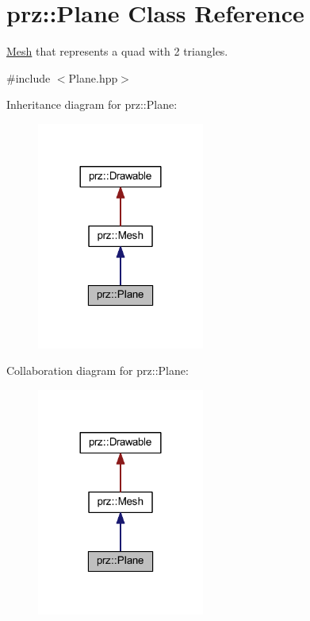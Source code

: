 \hypertarget{classprz_1_1_plane}{}\section{prz\+::Plane Class Reference}
\label{classprz_1_1_plane}


\mbox{\hyperlink{classprz_1_1_mesh}{Mesh}} that represents a quad with 2 triangles.  




{\ttfamily \#include $<$Plane.\+hpp$>$}



Inheritance diagram for prz\+::Plane\+:
\nopagebreak
\begin{figure}[H]
\begin{center}
\leavevmode
\includegraphics[width=156pt]{classprz_1_1_plane__inherit__graph}
\end{center}
\end{figure}


Collaboration diagram for prz\+::Plane\+:
\nopagebreak
\begin{figure}[H]
\begin{center}
\leavevmode
\includegraphics[width=156pt]{classprz_1_1_plane__coll__graph}
\end{center}
\end{figure}
